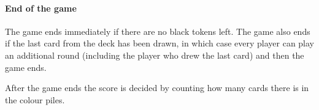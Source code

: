 \paragraph{End of the game}
The game ends immediately if there are no black tokens left. 
The game also ends if the last card from the deck has been drawn, in which case every player can play an additional round (including the player who drew the last card) and then the game ends.

After the game ends the score is decided by counting how many cards there is in the colour piles.





